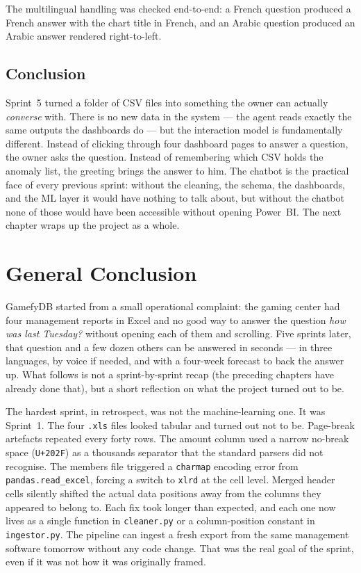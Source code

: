 The multilingual handling was checked end-to-end: a French question
produced a French answer with the chart title in French, and an Arabic
question produced an Arabic answer rendered right-to-left.

\section{Conclusion}

Sprint~5 turned a folder of CSV files into something the owner can
actually \emph{converse} with. There is no new data in the system ---
the agent reads exactly the same outputs the dashboards do --- but the
interaction model is fundamentally different. Instead of clicking
through four dashboard pages to answer a question, the owner asks the
question. Instead of remembering which CSV holds the anomaly list, the
greeting brings the answer to him. The chatbot is the practical face
of every previous sprint: without the cleaning, the schema, the
dashboards, and the ML layer it would have nothing to talk about, but
without the chatbot none of those would have been accessible without
opening Power~BI. The next chapter wraps up the project as a whole.
\chapter*{General Conclusion}

GamefyDB started from a small operational complaint: the gaming center had four
management reports in Excel and no good way to answer the question \emph{how was
last Tuesday?} without opening each of them and scrolling. Five sprints later, that
question and a few dozen others can be answered in seconds --- in three languages,
by voice if needed, and with a four-week forecast to back the answer up. What
follows is not a sprint-by-sprint recap (the preceding chapters have already done
that), but a short reflection on what the project turned out to be.

The hardest sprint, in retrospect, was not the machine-learning one. It was
Sprint~1. The four \texttt{.xls} files looked tabular and turned out not to be.
Page-break artefacts repeated every forty rows. The amount column used a narrow
no-break space (\texttt{U+202F}) as a thousands separator that the standard
parsers did not recognise. The members file triggered a \texttt{charmap} encoding
error from \texttt{pandas.read\_excel}, forcing a switch to \texttt{xlrd} at the
cell level. Merged header cells silently shifted the actual data positions away
from the columns they appeared to belong to. Each fix took longer than expected,
and each one now lives as a single function in \texttt{cleaner.py} or a
column-position constant in \texttt{ingestor.py}. The pipeline can ingest a fresh
export from the same management software tomorrow without any code change. That
was the real goal of the sprint, even if it was not how it was originally framed.

